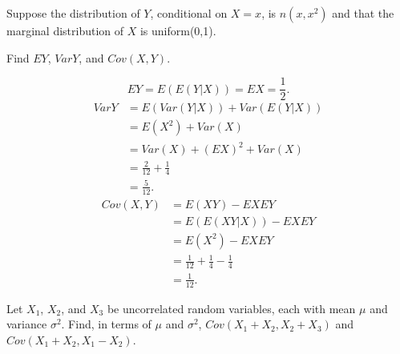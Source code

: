 \documentclass[14pt]{elegantbook}
\begin{document}


\setcounter{chapter}{8}

\chapter{}
\setcounter{chapter}{4}
\setcounter{exer}{29}
    \begin{exercise}
        Suppose the distribution of $Y$, conditional on $X=x$, is $n(x, x^2)$ and that the marginal distribution of $X$ is uniform(0,1). 
        
        Find $EY$, $Var Y$, and $Cov(X, Y)$. 
    \end{exercise}

    \begin{solution}
        \[EY=E(E(Y|X))=EX=\frac{1}{2}. \]
        \begin{align*}
            VarY&=E(Var(Y|X))+Var(E(Y|X))\\
            &=E(X^2)+Var(X)\\
            &=Var(X)+(EX)^2+Var(X)\\
            &=\frac{2}{12}+\frac{1}{4}\\
            &=\frac{5}{12}.
        \end{align*}
        \begin{align*}
            Cov(X, Y)&=E(XY)-EXEY\\
            &=E(E(XY|X))-EXEY\\
            &=E(X^2)-EXEY\\
            &=\frac{1}{12}+\frac{1}{4}-\frac{1}{4}\\
            &=\frac{1}{12}.
        \end{align*}
    \end{solution}

    \setcounter{exer}{42}
    \begin{exercise}
        Let $X_1$, $X_2$, and $X_3$ be uncorrelated random variables, each with mean $\mu$ and variance $\sigma^2$. Find, in terms of $\mu$ and $\sigma^2$, $Cov(X_1 + X_2, X_2 + X_3)$ and $Cov(X_1 + X_2, X_1 - X_2)$. 
    \end{exercise}
\end{document}
